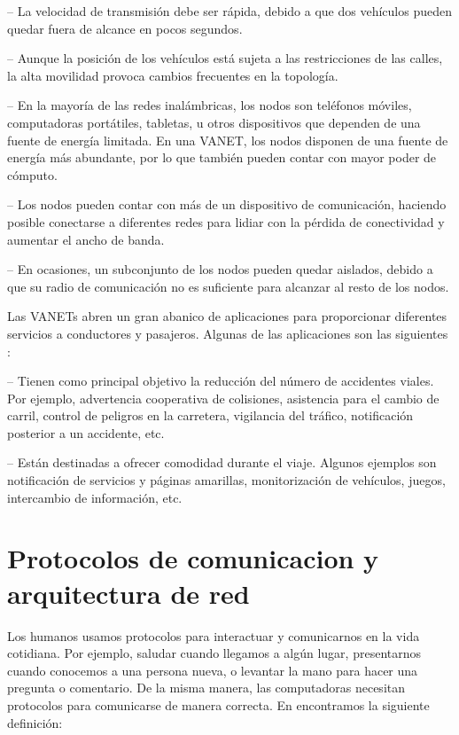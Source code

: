  -- La velocidad de transmisión debe ser
rápida, debido a que dos vehículos pueden quedar fuera de alcance en pocos
segundos.

 -- Aunque la posición de los vehículos está sujeta a las
restricciones de las calles, la alta movilidad provoca cambios frecuentes en
la topología.

 -- En la mayoría de las redes inalámbricas, los nodos son
teléfonos móviles, computadoras portátiles, tabletas, u otros dispositivos que
dependen de una fuente de energía limitada. En una VANET, los nodos disponen de
una fuente de energía más abundante, por lo que también pueden contar con mayor
poder de cómputo.

 -- Los nodos pueden contar con más de un dispositivo de
comunicación, haciendo posible conectarse a diferentes redes  para lidiar con la
pérdida de conectividad y aumentar el ancho de banda.

 -- En ocasiones, un subconjunto de los nodos
pueden quedar aislados, debido a que su radio de comunicación no es suficiente
para alcanzar al resto de los nodos.

Las VANETs abren un gran abanico de aplicaciones para proporcionar diferentes
servicios a conductores y pasajeros. Algunas de las aplicaciones son las
siguientes \cite{Meneguette2018}:

 -- Tienen como principal objetivo la
reducción del número de accidentes viales. Por ejemplo, advertencia cooperativa
de colisiones, asistencia para el cambio de carril, control de peligros en la
carretera, vigilancia del tráfico, notificación posterior a un accidente, etc.

 -- Están destinadas a ofrecer comodidad
durante el viaje. Algunos ejemplos son notificación de servicios y páginas
amarillas, monitorización de vehículos, juegos, intercambio de información,
etc.

\section{Protocolos de comunicacion y arquitectura de red}
\label{sec:protocolos_de_comunicacion_y_arquitectura_de_red}

Los humanos usamos protocolos para interactuar y comunicarnos en la vida
cotidiana. Por ejemplo, saludar cuando llegamos a algún lugar, presentarnos
cuando conocemos a una persona nueva, o levantar la mano para hacer una pregunta
o comentario. De la misma manera, las computadoras necesitan protocolos para
comunicarse de manera correcta. En \cite{Kurose2013} encontramos la siguiente
definición:

